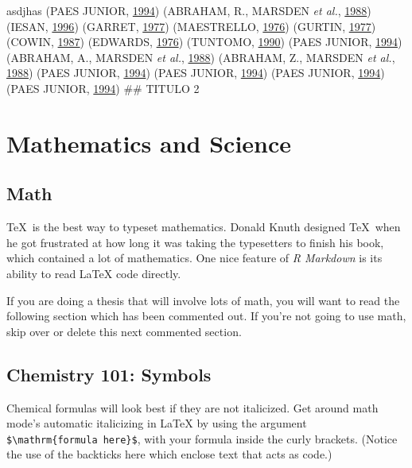 \documentclass[grad,numbers]{coppe}
\begin{document}
  asdjhas (PAES JUNIOR, \protect\hyperlink{ref-phdthesis-example}{1994}) (ABRAHAM, R., MARSDEN \emph{et al.}, \protect\hyperlink{ref-book-example}{1988}) (IESAN, \protect\hyperlink{ref-article-example}{1996}) (GARRET, \protect\hyperlink{ref-techreport-exampleIn}{1977}) (MAESTRELLO, \protect\hyperlink{ref-techreport-example}{1976}) (GURTIN, \protect\hyperlink{ref-inproceedings-example}{1977}) (COWIN, \protect\hyperlink{ref-incollection-example}{1987}) (EDWARDS, \protect\hyperlink{ref-inbook-example}{1976}) (TUNTOMO, \protect\hyperlink{ref-mastersthesis-example}{1990}) (PAES JUNIOR, \protect\hyperlink{ref-phdthesis-example}{1994}) (ABRAHAM, A., MARSDEN \emph{et al.}, \protect\hyperlink{ref-teste-1}{1988}) (ABRAHAM, Z., MARSDEN \emph{et al.}, \protect\hyperlink{ref-teste-2}{1988}) (PAES JUNIOR, \protect\hyperlink{ref-phdthesis-example}{1994}) (PAES JUNIOR, \protect\hyperlink{ref-phdthesis-example}{1994}) (PAES JUNIOR, \protect\hyperlink{ref-phdthesis-example}{1994}) (PAES JUNIOR, \protect\hyperlink{ref-phdthesis-example}{1994})
  \#\# TITULO 2
  
  \hypertarget{math-sci}{%
  \chapter{Mathematics and Science}\label{math-sci}}
  
  \hypertarget{math}{%
  \section{Math}\label{math}}
  
  \TeX~is the best way to typeset mathematics. Donald Knuth designed \TeX~when he got frustrated at how long it was taking the typesetters to finish his book, which contained a lot of mathematics. One nice feature of \emph{R Markdown} is its ability to read LaTeX code directly.
  
  If you are doing a thesis that will involve lots of math, you will want to read the following section which has been commented out. If you're not going to use math, skip over or delete this next commented section.
  
  \hypertarget{chemistry-101-symbols}{%
  \section{Chemistry 101: Symbols}\label{chemistry-101-symbols}}
  
  Chemical formulas will look best if they are not italicized. Get around math mode's automatic italicizing in LaTeX by using the argument \texttt{\$\textbackslash{}mathrm\{formula\ here\}\$}, with your formula inside the curly brackets. (Notice the use of the backticks here which enclose text that acts as code.)
  
\end{document}
